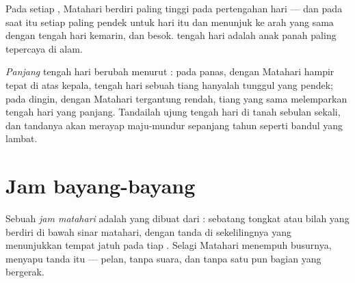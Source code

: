 \begin{proposition}\label{prop:g3:sun-days-seasons:midday}
Pada setiap , Matahari berdiri paling tinggi pada pertengahan
hari --- dan pada saat itu setiap  paling pendek untuk
hari itu dan menunjuk ke arah yang sama dengan  tengah
hari kemarin, dan besok.  tengah hari adalah anak panah
paling tepercaya di alam.
\end{proposition}

\begin{example}\label{ex:g3:sun-days-seasons:shadowlength}
\emph{Panjang}  tengah hari berubah menurut : pada
 panas, dengan Matahari hampir tepat di atas kepala,
 tengah hari sebuah tiang hanyalah tunggul yang pendek;
pada  dingin, dengan Matahari tergantung rendah, tiang yang sama
melemparkan  tengah hari yang panjang. Tandailah ujung
 tengah hari di tanah sebulan sekali, dan tandanya akan
merayap maju-mundur sepanjang tahun seperti bandul yang lambat.
\end{example}

\section{Jam bayang-bayang}

\begin{definition}\label{def:g3:sun-days-seasons:sundial}
Sebuah \emph{jam matahari} adalah  yang dibuat
dari : sebatang tongkat atau bilah yang berdiri di bawah
sinar matahari, dengan tanda di sekelilingnya yang menunjukkan tempat
 jatuh pada tiap . Selagi Matahari menempuh
busurnya,  menyapu tanda itu --- pelan, tanpa suara,
dan tanpa satu pun bagian yang bergerak.
\end{definition}

